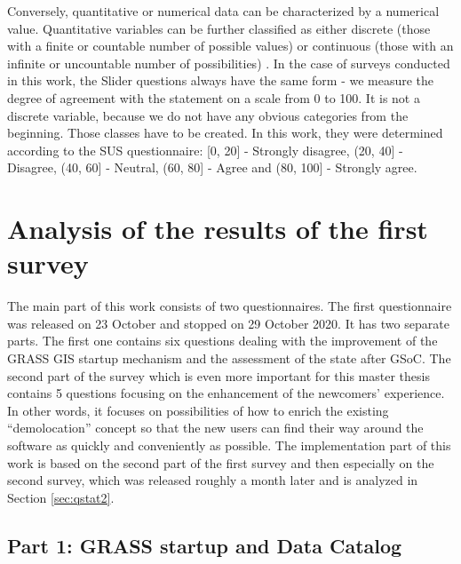 \documentclass[a4paper,10pt,twoside]{article}
\begin{document}
Conversely, quantitative or numerical data can be characterized by a
numerical value. Quantitative variables can be further classified as
either discrete (those with a finite or countable number of possible
values) or continuous (those with an infinite or uncountable number of
possibilities) \cite{wisconsin1}. In the case of surveys conducted in
this work, the Slider questions always have the same form - we measure
the degree of agreement with the statement on a scale from 0 to
100. It is not a discrete variable, because we do not have any obvious
categories from the beginning. Those classes have to be created. In
this work, they were determined according to the SUS questionnaire:
[0, 20] - Strongly disagree, (20, 40] - Disagree, (40, 60] - Neutral,
(60, 80] - Agree and (80, 100] - Strongly agree.




\newpage
\vspace*{-1cm}
\section{Analysis of the results of the first survey}
\label{sec:qstat}

\noindent The main part of this work consists of two
questionnaires. The first questionnaire was released on 23 October and
stopped on 29 October 2020. It has two separate parts. The first one
contains six questions dealing with the improvement of the GRASS GIS
startup mechanism and the assessment of the state after GSoC. The
second part of the survey which is even more important for this master
thesis contains 5 questions focusing on the enhancement of the
newcomers' experience. In other words, it focuses on possibilities of
how to enrich the existing ``demolocation'' concept so that the new
users can find their way around the software as quickly and
conveniently as possible. The implementation part of this work is
based on the second part of the first survey and then especially on
the second survey, which was released roughly a month later and is
analyzed in Section \ref{sec:qstat2}.

\subsection{Part 1: GRASS startup and Data Catalog}
\end{document}
